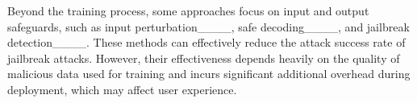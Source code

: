 Beyond the training process, some approaches focus on input and output safeguards, such as input perturbation____, safe decoding____, and jailbreak detection____. These methods can effectively reduce the attack success rate of jailbreak attacks. 
However, their effectiveness depends heavily on the quality of malicious data used for training and incurs significant additional overhead during deployment, which may affect user experience.


